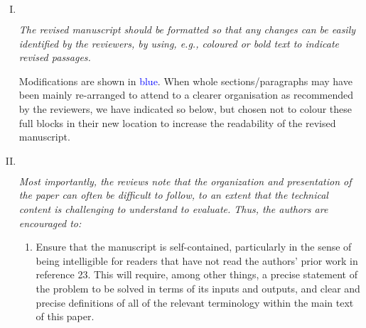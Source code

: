\documentclass[11pt]{article}
\newenvironment{reviewer}
{\begin{mdframed}[roundcorner = 10pt,fontcolor=blue!70!black]\itshape}
{\end{mdframed}}
\begin{document}
\begin{enumerate}[I.]
 \item $ $
  \begin{reviewer}
  The revised manuscript should be formatted so that any changes can be easily identified by the reviewers, by using, e.g., coloured or bold text to indicate revised passages.
  \end{reviewer}

\noindent
Modifications are shown in \textcolor{blue}{blue}. When whole sections/paragraphs may have been mainly re-arranged to attend to a clearer organisation as recommended by the reviewers, we have indicated so below, but chosen not to colour these full blocks in their new location to increase the readability of the revised manuscript.

\item $ $
  \begin{reviewer}
Most importantly, the reviews note that the organization and presentation of the paper can often be difficult to follow, to an extent that the technical content is challenging to understand to evaluate. 
Thus, the authors are encouraged to: 

\begin{enumerate}
\item Ensure that the manuscript is self-contained, particularly in the sense of being intelligible for readers that have not read the authors' prior work in reference 23. 
This will require, among other things, a precise statement of the problem to be solved in terms of its inputs and outputs, and clear and precise definitions of all of the relevant terminology within the main text of this paper. 


\end{enumerate}
\end{reviewer}
\end{enumerate}
\end{document}
